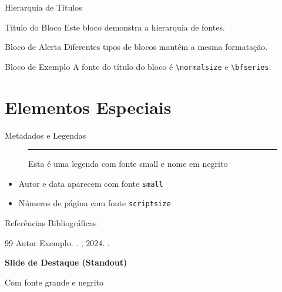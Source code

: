 \documentclass[10pt]{beamer}
\begin{document}
\begin{frame}{Hierarquia de Títulos}
  \begin{block}{Título do Bloco}
    Este bloco demonstra a hierarquia de fontes.
  \end{block}
  
  \begin{alertblock}{Bloco de Alerta}
    Diferentes tipos de blocos mantêm a mesma formatação.
  \end{alertblock}
  
  \begin{exampleblock}{Bloco de Exemplo}
    A fonte do título do bloco é \texttt{\textbackslash normalsize} e \texttt{\textbackslash bfseries}.
  \end{exampleblock}
\end{frame}

\section{Elementos Especiais}
\begin{frame}{Metadados e Legendas}
  \begin{figure}
    \rule{0.8\textwidth}{0.4\textwidth}
    \caption{Esta é uma legenda com fonte small e nome em negrito}
  \end{figure}
  
  \begin{itemize}
    \item Autor e data aparecem com fonte \texttt{small}
    \item Números de página com fonte \texttt{scriptsize}
  \end{itemize}
\end{frame}

\begin{frame}{Referências Bibliográficas}
  \begin{thebibliography}{99}
     Autor Exemplo.
    .
    , 2024.
    .
  \end{thebibliography}
\end{frame}

\begin{frame}[standout]
  \centering
  \Large\textbf{Slide de Destaque (Standout)}
  
  \normalsize Com fonte grande e negrito
\end{frame}
\end{document}
